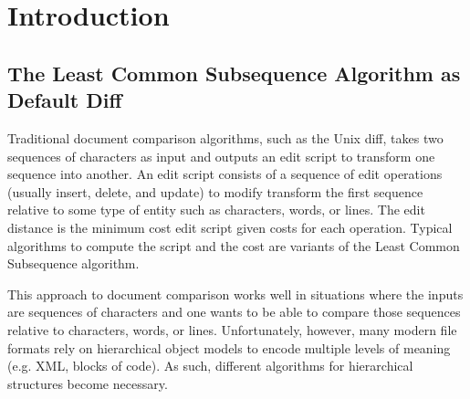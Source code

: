 \documentclass{article}
\title{\papertitle}
\begin{document}
%
\capstartfalse
\maketitle
\capstarttrue
%
\begin{abstract}
We describe an application of hierarchic diff to the collaborative editing of tree-based music representations, using Zhang and Shasha's tree edit distance
algorithm, as implemented within the XUDiff tool: the edit distance between two trees is the minimum number of edit operations necessary
to transform one tree into another.  We consider common operations on the score tree -- deleting, changing, and appending tree nodes -- to derive a minimal edit sequence, known as an edit script, and we benchmark the widely used Longest Common Substring algorithm against our approach to demonstrate its superior performance.
\end{abstract}
%

\section{Introduction}\label{sec:introduction}
\subsection{The Least Common Subsequence Algorithm as Default Diff}
Traditional document comparison algorithms, such as the Unix diff,
takes two sequences of characters as input and outputs an edit script
to transform one sequence into another.  An edit script consists of a
sequence of edit operations (usually insert, delete, and update) to
modify transform the first sequence relative to some type of entity
such as characters, words, or lines.  The edit distance is the minimum
cost edit script given costs for each operation.  Typical algorithms
to compute the script and the cost are variants of the Least Common
Subsequence algorithm.  


This approach to document comparison works well in situations where
the inputs are sequences of characters and one wants to be
able to compare those sequences relative to characters, words, or
lines.  Unfortunately, however, many modern file formats rely on
hierarchical object models to encode multiple levels of meaning
(e.g. XML, blocks of code).  As such, different algorithms for
hierarchical structures become necessary.  
\end{document}
